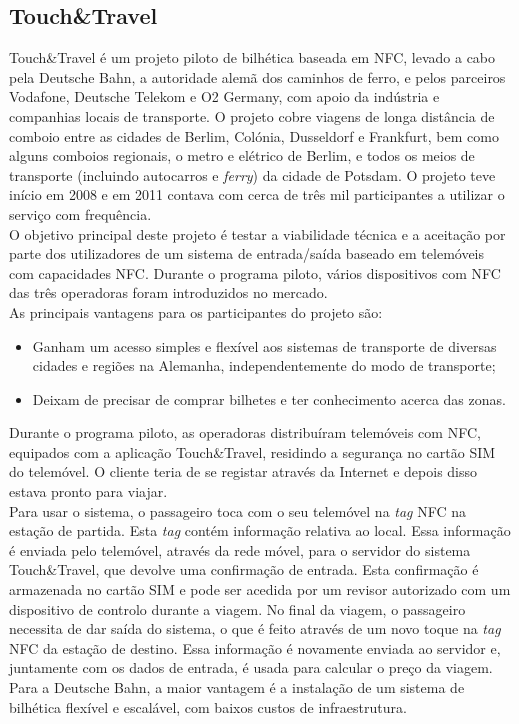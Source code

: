\subsection{Touch\&Travel}

Touch\&Travel é um projeto piloto de bilhética baseada em NFC, levado a cabo pela Deutsche Bahn, a autoridade alemã dos caminhos de ferro, e pelos parceiros Vodafone, Deutsche Telekom e O2 Germany, com apoio da indústria e companhias locais de transporte. O projeto cobre viagens de longa distância de comboio entre as cidades de Berlim, Colónia, Dusseldorf e Frankfurt, bem como alguns comboios regionais, o metro e elétrico de Berlim, e todos os meios de transporte (incluindo autocarros e \textit{ferry}) da cidade de Potsdam. O projeto teve início em 2008 e em 2011 contava com cerca de três mil participantes a utilizar o serviço com frequência.
\\O objetivo principal deste projeto é testar a viabilidade técnica e a aceitação por parte dos utilizadores de um sistema de entrada/saída baseado em telemóveis com capacidades NFC. Durante o programa piloto, vários dispositivos com NFC das três operadoras foram introduzidos no mercado.
\\As principais vantagens para os participantes do projeto são:
\begin{itemize}
\item Ganham um acesso simples e flexível aos sistemas de transporte de diversas cidades e regiões na Alemanha, independentemente do modo de transporte;
\item Deixam de precisar de comprar bilhetes e ter conhecimento acerca das zonas.
\end{itemize}

Durante o programa piloto, as operadoras distribuíram telemóveis com NFC, equipados com a aplicação Touch\&Travel, residindo a segurança no cartão SIM do telemóvel. O cliente teria de se registar através da Internet e depois disso estava pronto para viajar.
\\Para usar o sistema, o passageiro toca com o seu telemóvel na \textit{tag} NFC na estação de partida. Esta \textit{tag} contém informação relativa ao local. Essa informação é enviada pelo telemóvel, através da rede móvel, para o servidor do sistema Touch\&Travel, que devolve uma confirmação de entrada. Esta confirmação é armazenada no cartão SIM e pode ser acedida por um revisor autorizado com um dispositivo de controlo durante a viagem. No final da viagem, o passageiro necessita de dar saída do sistema, o que é feito através de um novo toque na \textit{tag} NFC da estação de destino. Essa informação é novamente enviada ao servidor e, juntamente com os dados de entrada, é usada para calcular o preço da viagem.
\\Para a Deutsche Bahn, a maior vantagem é a instalação de um sistema de bilhética flexível e escalável, com baixos custos de infraestrutura.\cite{NFCForum2011}

